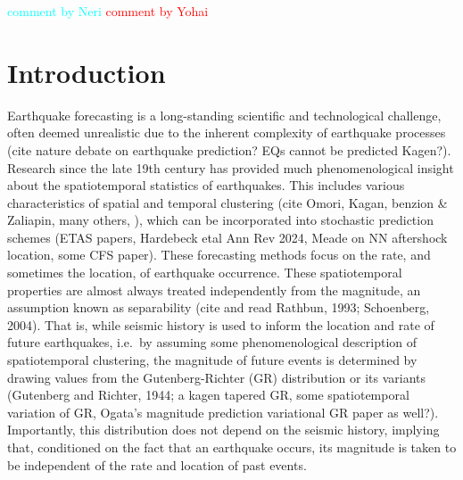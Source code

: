 \documentclass[pdflatex]{sn-jnl}
\newcommand{\yohai}[1]{{\textcolor{red}{#1}}}
\newcommand{\neri}[1]{{\textcolor{cyan}{#1}}}
\begin{document}
\keywords{}

\maketitle

\neri{comment by Neri} \newline
\yohai{comment by Yohai}


\section{Introduction} \label{sec:introduction}

Earthquake forecasting is a long-standing scientific and technological challenge, often deemed unrealistic due to the inherent complexity of earthquake processes \cite{geller_earthquakes_1997, bernard_earthquake_1999} (cite nature debate on earthquake prediction? EQs cannot be predicted Kagen?). Research since the late 19th century has provided much phenomenological insight about the spatiotemporal statistics of earthquakes. This includes various characteristics of spatial and temporal clustering (cite Omori, Kagan, benzion \& Zaliapin, many others, ), which can be incorporated into stochastic prediction schemes (ETAS papers, Hardebeck etal Ann Rev 2024, Meade on NN aftershock location, some CFS paper). These forecasting methods focus on the rate, and sometimes the location, of earthquake occurrence. These spatiotemporal properties are almost always treated independently from the magnitude, an assumption known as separability (cite and read Rathbun, 1993; Schoenberg, 2004). That is, while seismic history is used to inform the location and rate of future earthquakes, i.e.~by assuming some phenomenological description of spatiotemporal clustering, the magnitude of future events is determined by drawing values from the Gutenberg-Richter (GR) distribution or its variants (Gutenberg and Richter, 1944;  a kagen tapered GR, some spatiotemporal variation of GR, Ogata's magnitude prediction variational GR paper as well?). Importantly, this distribution does not depend on the seismic history, implying that, conditioned on the fact that an earthquake occurs, its magnitude is taken to be independent of the rate and location of past events. %
\end{document}
